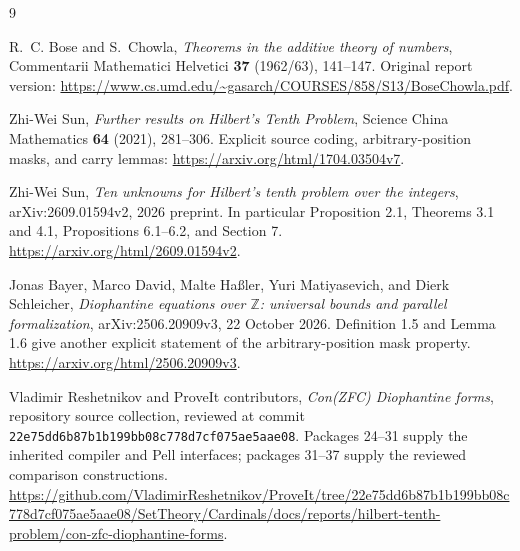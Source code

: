 \documentclass[11pt,letterpaper]{article}
\newcommand{\Z}{\mathbb Z}
\theoremstyle{remark}
\begin{document}
\begin{thebibliography}{9}

R.~C. Bose and S.~Chowla,
\emph{Theorems in the additive theory of numbers},
Commentarii Mathematici Helvetici \textbf{37} (1962/63), 141--147.
Original report version:
\url{https://www.cs.umd.edu/~gasarch/COURSES/858/S13/BoseChowla.pdf}.

Zhi-Wei Sun,
\emph{Further results on Hilbert's Tenth Problem},
Science China Mathematics \textbf{64} (2021), 281--306.
Explicit source coding, arbitrary-position masks, and carry lemmas:
\url{https://arxiv.org/html/1704.03504v7}.

Zhi-Wei Sun,
\emph{Ten unknowns for Hilbert's tenth problem over the integers},
arXiv:2609.01594v2, 2026 preprint.
In particular Proposition 2.1, Theorems 3.1 and 4.1,
Propositions 6.1--6.2, and Section 7.
\url{https://arxiv.org/html/2609.01594v2}.

Jonas Bayer, Marco David, Malte Ha{\ss}ler, Yuri Matiyasevich,
and Dierk Schleicher,
\emph{Diophantine equations over \(\Z\): universal bounds and parallel
formalization}, arXiv:2506.20909v3, 22 October 2026.
Definition 1.5 and Lemma 1.6 give another explicit statement of the
arbitrary-position mask property.
\url{https://arxiv.org/html/2506.20909v3}.

Vladimir Reshetnikov and ProveIt contributors,
\emph{Con(ZFC) Diophantine forms}, repository source collection,
reviewed at commit
\texttt{22e75dd6b87b1b199bb08c778d7cf075ae5aae08}.
Packages 24--31 supply the inherited compiler and Pell interfaces;
packages 31--37 supply the reviewed comparison constructions.
\url{https://github.com/VladimirReshetnikov/ProveIt/tree/22e75dd6b87b1b199bb08c778d7cf075ae5aae08/SetTheory/Cardinals/docs/reports/hilbert-tenth-problem/con-zfc-diophantine-forms}.

\end{thebibliography}
\end{document}

